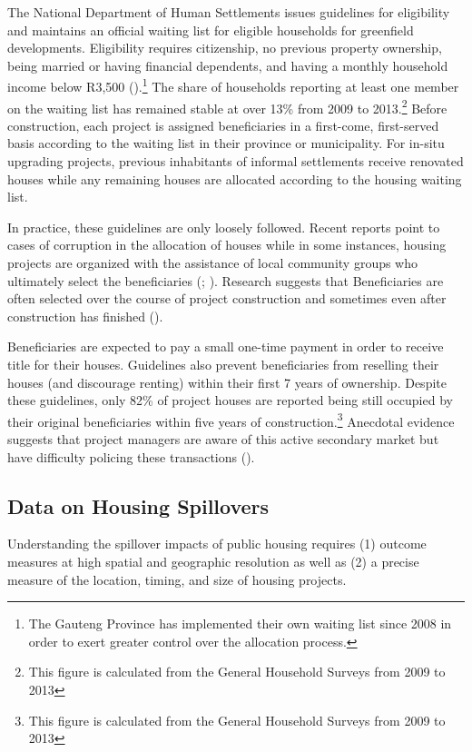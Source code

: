 \documentclass[12pt]{article}
\begin{document}
The National Department of Human Settlements issues guidelines for eligibility and maintains an official waiting list for eligible households for greenfield developments.  Eligibility requires citizenship, no previous property ownership, being married or having financial dependents, and having a monthly household income below R3,500 (\cite{seriq}).\footnote{The Gauteng Province has implemented their own waiting list since 2008 in order to exert greater control over the allocation process.}  The share of households reporting at least one member on the waiting list has remained stable at over 13\% from 2009 to 2013.\footnote{This figure is calculated from the General Household Surveys from 2009 to 2013}  Before construction, each project is assigned beneficiaries in a first-come, first-served basis according to the waiting list in their province or municipality.  For in-situ upgrading projects, previous inhabitants of informal settlements receive renovated houses while any remaining houses are allocated according to the housing waiting list.

In practice, these guidelines are only loosely followed.  Recent reports point to cases of corruption in the allocation of houses while in some instances, housing projects are organized with the assistance of local community groups who ultimately select the beneficiaries (\cite{seriq}; \cite{casestudytinazonke}).  Research suggests that Beneficiaries are often selected over the course of project construction and sometimes even after construction has finished (\cite{seriq}).

Beneficiaries are expected to pay a small one-time payment in order to receive title for their houses.  Guidelines also prevent beneficiaries from reselling their houses (and discourage renting) within their first 7 years of ownership.  Despite these guidelines, only 82\% of project houses are reported being still occupied by their original beneficiaries within five years of construction.\footnote{This figure is calculated from the General Household Surveys from 2009 to 2013}  Anecdotal evidence suggests that project managers are aware of this active secondary market but have difficulty policing these transactions (\cite{resale}).

\subsection{Data on Housing Spillovers}

Understanding the spillover impacts of public housing requires (1) outcome measures at high spatial and geographic resolution as well as (2) a precise measure of the location, timing, and size of housing projects.  
\end{document}
